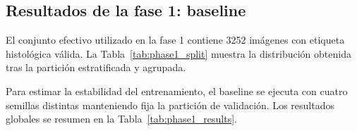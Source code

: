 ﻿\documentclass[10pt,a4paper,twocolumn,twoside]{article}
\begin{document}
\subsection{Resultados de la fase 1: baseline}
El conjunto efectivo utilizado en la fase 1 contiene 3252 imágenes con etiqueta histológica válida. La Tabla~\ref{tab:phase1_split} muestra la distribución obtenida tras la partición estratificada y agrupada.

\begin{table}[t]
\centering
\small
\setlength{\tabcolsep}{4pt}
\caption{Distribución de clases en la fase 1}
\label{tab:phase1_split}
\end{table}

Para estimar la estabilidad del entrenamiento, el baseline se ejecuta con cuatro semillas distintas manteniendo fija la partición de validación. Los resultados globales se resumen en la Tabla~\ref{tab:phase1_results}.

\begin{table}[t]
\centering
\small
\setlength{\tabcolsep}{4pt}
\caption{Resultados del baseline en validación}
\label{tab:phase1_results}
\end{table}
\end{document}
